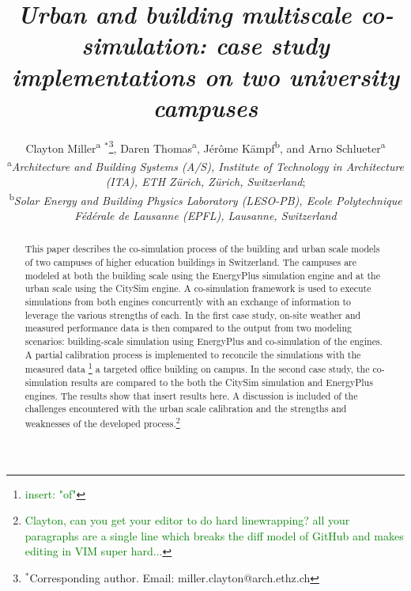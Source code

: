 \documentclass{tBPS2e}
\theoremstyle{plain}
\theoremstyle{definition}
\theoremstyle{remark}
\newcommand{\noteDT}[1]{\footnote{\textcolor{green}{#1}}}
\begin{document}


\title{\textit{Urban and building multiscale co-simulation: case study implementations on two university campuses}}

\author{Clayton Miller\textsuperscript{a}%
$^{\ast}$\thanks{$^\ast$Corresponding author. Email: miller.clayton@arch.ethz.ch}, 
Daren Thomas\textsuperscript{a},
J\'er\^ome K\"ampf\textsuperscript{b},
and Arno Schlueter\textsuperscript{a}\\
\vspace{6pt}
\textsuperscript{a}{\em Architecture and Building Systems (A/S), Institute of Technology in Architecture (ITA), ETH Z\"urich, Z\"urich, Switzerland};\\
\textsuperscript{b}{\em Solar Energy and Building Physics Laboratory (LESO-PB), Ecole Polytechnique F\'ed\'erale de Lausanne (EPFL), Lausanne, Switzerland}
}

\maketitle

\begin{abstract}
    This paper describes the co-simulation process of the building and urban scale models of two campuses of higher education buildings in Switzerland. The campuses are modeled at both the building scale using the EnergyPlus simulation engine and at the urban scale using the CitySim engine. A co-simulation framework is used to execute simulations from both engines concurrently with an exchange of information to leverage the various strengths of each. In the first case study, on-site weather and measured performance data is then compared to the output from two modeling scenarios: building-scale simulation using EnergyPlus and co-simulation of the engines. A partial calibration process is implemented to reconcile the simulations with the measured data \noteDT{insert: "of"} a targeted office building on campus. In the second case study, the co-simulation results are compared to the both the CitySim simulation and EnergyPlus engines. The results show that {\color{red}insert results here}. A discussion is included of the challenges encountered with the urban scale calibration and the strengths and weaknesses of the developed process.\noteDT{Clayton, can you get your editor to do hard linewrapping? all your paragraphs are a single line which breaks the diff model of GitHub and makes editing in VIM super hard...}
\end{abstract}
\end{document}
